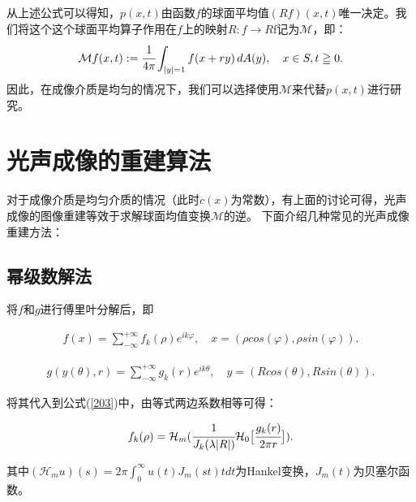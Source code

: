 从上述公式可以得知，$p(x,t)$由函数$f$的球面平均值$(Rf)(x,t)$唯一决定。我们将这个这个球面平均算子作用在$f$上的映射$R:f→R$f记为$\mathcal{M}$，即：
\begin{equation} \label{204}
	\begin{aligned}
		\mathcal{M}f(x,t):=\cfrac{1}{4\pi}\int_{|y|=1} f(x+ry)\, dA(y),\quad x\in S,t\geqq0.
	\end{aligned}
\end{equation}
因此，在成像介质是均匀的情况下，我们可以选择使用$\mathcal{M}$来代替$p(x,t)$进行研究。

\section{光声成像的重建算法}
对于成像介质是均匀介质的情况（此时$c(x)$为常数），有上面的讨论可得，光声成像的图像重建等效于求解球面均值变换$\mathcal{M}$的逆。
下面介绍几种常见的光声成像重建方法：

\subsection{幂级数解法}
将$f$和$g$进行傅里叶分解后，即

\begin{equation} \label{205}
	\begin{aligned}
		f(x)=\sum_{-\infty}^{+\infty} f_k(\rho )e^{ik\varphi},\quad x=(\rho cos(\varphi),\rho sin(\varphi)).
	\end{aligned}
\end{equation}

\begin{equation} \label{206}
	\begin{aligned}
		g(y(\theta),r)=\sum_{-\infty}^{+\infty}g_k(r)e^{ik\theta},\quad y=(Rcos(\theta),Rsin(\theta)).
	\end{aligned}
\end{equation}

将其代入到公式(\ref{203})中，由等式两边系数相等可得：

\begin{equation} \label{207}
	\begin{aligned}
		f_k(\rho)=\mathcal{H}_m(\cfrac{1}{J_k(\lambda|R|)}\mathcal{H}_0\big[ \cfrac{g_k(r)}{2\pi r}\big]).
	\end{aligned}
\end{equation}

其中$(\mathcal{H}_mu)(s)=2\pi \int_{0}^{\infty}u(t)J_m(st)t dt$为Hankel变换，$J_m(t)$为贝塞尔函数。

